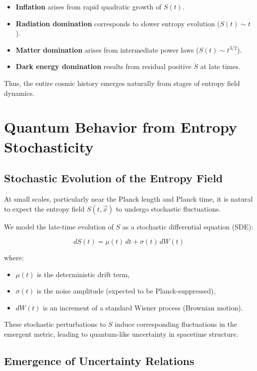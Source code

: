 \documentclass{article}
\begin{document}
\begin{itemize}
    \item \textbf{Inflation} arises from rapid quadratic growth of $S(t)$.
    \item \textbf{Radiation domination} corresponds to slower entropy evolution ($S(t) \sim t$).
    \item \textbf{Matter domination} arises from intermediate power laws ($S(t) \sim t^{3/2}$).
    \item \textbf{Dark energy domination} results from residual positive $\ddot{S}$ at late times.
\end{itemize}

Thus, the entire cosmic history emerges naturally from stages of entropy field dynamics.

\section{Quantum Behavior from Entropy Stochasticity}

\subsection{Stochastic Evolution of the Entropy Field}

At small scales, particularly near the Planck length and Planck time, it is natural to expect the entropy field $S(t, \vec{x})$ to undergo stochastic fluctuations.

We model the late-time evolution of $S$ as a stochastic differential equation (SDE):

\begin{equation}
dS(t) = \mu(t) \, dt + \sigma(t) \, dW(t)
\end{equation}

where:
\begin{itemize}
    \item $\mu(t)$ is the deterministic drift term,
    \item $\sigma(t)$ is the noise amplitude (expected to be Planck-suppressed),
    \item $dW(t)$ is an increment of a standard Wiener process (Brownian motion).
\end{itemize}

These stochastic perturbations to $S$ induce corresponding fluctuations in the emergent metric, leading to quantum-like uncertainty in spacetime structure.

\subsection{Emergence of Uncertainty Relations}
\end{document}
